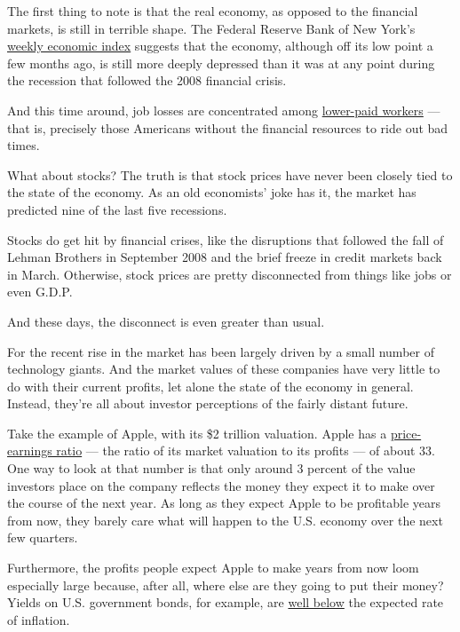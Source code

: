 The first thing to note is that the real economy, as opposed to the
financial markets, is still in terrible shape. The Federal Reserve Bank
of New York's
\href{https://www.newyorkfed.org/research/policy/weekly-economic-index\#/interactive}{weekly
economic index} suggests that the economy, although off its low point a
few months ago, is still more deeply depressed than it was at any point
during the recession that followed the 2008 financial crisis.

And this time around, job losses are concentrated among
\href{https://tracktherecovery.org/}{lower-paid workers} --- that is,
precisely those Americans without the financial resources to ride out
bad times.

What about stocks? The truth is that stock prices have never been
closely tied to the state of the economy. As an old economists' joke has
it, the market has predicted nine of the last five recessions.

Stocks do get hit by financial crises, like the disruptions that
followed the fall of Lehman Brothers in September 2008 and the brief
freeze in credit markets back in March. Otherwise, stock prices are
pretty disconnected from things like jobs or even G.D.P.

And these days, the disconnect is even greater than usual.

For the recent rise in the market has been largely driven by a small
number of technology giants. And the market values of these companies
have very little to do with their current profits, let alone the state
of the economy in general. Instead, they're all about investor
perceptions of the fairly distant future.

Take the example of Apple, with its \$2 trillion valuation. Apple has a
\href{https://www.cnbc.com/2020/08/19/apples-2-trillion-value-proof-that-tim-cooks-services-plan-worked.html}{price-earnings
ratio} --- the ratio of its market valuation to its profits --- of about
33. One way to look at that number is that only around 3 percent of the
value investors place on the company reflects the money they expect it
to make over the course of the next year. As long as they expect Apple
to be profitable years from now, they barely care what will happen to
the U.S. economy over the next few quarters.

Furthermore, the profits people expect Apple to make years from now loom
especially large because, after all, where else are they going to put
their money? Yields on U.S. government bonds, for example, are
\href{https://fred.stlouisfed.org/series/DFII10}{well below} the
expected rate of inflation.

